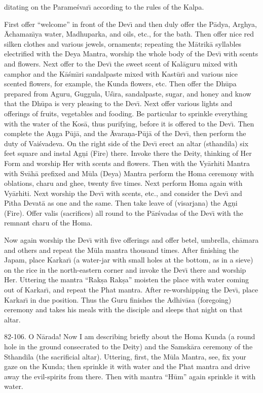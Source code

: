 ditating on the Parame\'svar\={\i} according to the rules of the Kalpa.

First offer ``welcome'' in front of the Dev\={\i} and then duly offer the P\=adya, Arghya, \=Achaman\={\i}ya water, Madhuparka, and oils, etc., for the bath. Then offer nice red silken clothes and various jewels, ornaments; repeating the M\=atrik\=a syllables electrified with the Deya Mantra, worship the whole body of the Dev\={\i} with scents and flowers. Next offer to the Dev\={\i} the sweet scent of Kal\=aguru mixed with camphor and the K\=a\'sm\={\i}ri sandalpaste mixed with Kast\=ur\={\i} and various nice scented flowers, for example, the Kunda flowers, etc. Then offer the Dh\=upa prepared from Aguru, Guggula, U\'s\={\i}ra, sandalpaste, sugar, and honey and know that the Dh\=upa is very pleasing to the Dev\={\i}. Next offer various lights and offerings of fruits, vegetables and fooding. Be particular to sprinkle everything with the water of the Kos\=a, thus purifying, before it is offered to the Dev\={\i}. Then complete the A\d{n}ga P\=uj\=a, and the \=Avara\d{n}a-P\=uj\=a of the Dev\={\i}, then perform the duty of Vai\'svadeva. On the right side of the Dev\={\i} erect an altar (sthandila) six feet square and instal Ag\d{n}i (Fire) there. Invoke there the Deity, thinking of Her Form and worship Her with scents and flowers. Then with the Vy\=arhiti Mantra with Sv\=ah\=a prefixed and M\=ula (Deya) Mantra perform the Homa ceremony with oblations, charu and ghee, twenty five times. Next perform Homa again with Vy\=arhiti. Next worship the Dev\={\i} with scents, etc., and consider the Dev\={\i} and P\={\i}tha Devat\=a as one and the same. Then take leave of (visarjana) the Ag\d{n}i (Fire). Offer valis (sacrifices) all round to the P\=ar\'svadas of the Dev\={\i} with the remnant charu of the Homa.

Now again worship the Dev\={\i} with five offerings and offer betel, umbrella, ch\=amara and others and repeat the M\=ula mantra thousand times. After finishing the Japam, place Karkar\={\i} (a water-jar with small holes at the bottom, as in a sieve) on the rice in the north-eastern corner and invoke the Dev\={\i} there and worship Her. Uttering the mantra ``Rak\d{s}a Rak\d{s}a'' moisten the place with water coming out of Karkar\={\i}, and repeat the Phat mantra. After re-worshipping the Dev\={\i}, place Karkar\={\i} in due position. Thus the Guru finishes the Adhiv\=asa (foregoing) ceremony and takes his meals with the disciple and sleeps that night on that altar.

82-106. O N\=arada! Now I am describing briefly about the Homa Kunda (a round hole in the ground consecrated to the Deity) and the Samsk\=ara ceremony of the Sthandila (the sacrificial altar). Uttering, first, the M\=ula Mantra, see, fix your gaze on the Kunda; then sprinkle it with water and the Phat mantra and drive away the evil-spirits from there. Then with mantra ``H\=um'' again sprinkle it with water.

